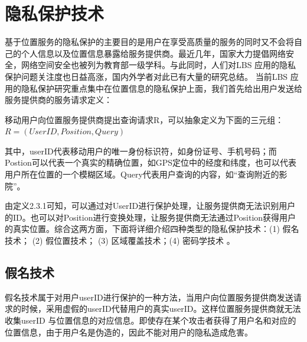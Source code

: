 \section{隐私保护技术}
基于位置服务的隐私保护的主要目的是用户在享受高质量的服务的同时又不会将自己的个人信息以及位置信息暴露给服务提供商。最近几年，国家大力提倡网络安全，网络空间安全也被列为教育部一级学科。与此同时，人们对LBS 应用的隐私保护问题关注度也日益高涨，国内外学者对此已有大量的研究总结\cite{group}\cite{Beresford}\cite{ChengR}。 当前LBS 应用的隐私保护研究重点集中在位置信息的隐私保护上面，我们首先给出用户发送给服务提供商的服务请求定义：
\begin{define}[：LBS服务请求]
移动用户向位置服务提供商提出查询请求R，可以抽象定义为下面的三元组：
$R=(UserID,Position,Query)$
\end{define}
其中，userID代表移动用户的唯一身份标识符，如身份证号、手机号码；而Postion可以代表一个真实的精确位置，如GPS定位中的经度和纬度，也可以代表用户所在位置的一个模糊区域。Query代表用户查询的内容，如“查询附近的影院”。

由定义2.3.1可知，可以通过对UserID进行保护处理，让服务提供商无法识别用户的ID。也可以对Position进行变换处理，让服务提供商无法通过Position获得用户的真实位置。综合这两方面，下面将详细介绍四种类型的隐私保护技术：(1) 假名技术； (2) 假位置技术； (3) 区域覆盖技术；(4) 密码学技术 。

\subsection{假名技术}
假名技术属于对用户userID进行保护的一种方法，当用户向位置服务提供商发送请求的时候，采用虚假的userID代替用户的真实userID。这样位置服务提供商就无法收集userID 与位置信息的对应信息。即使存在某个攻击者获得了用户名和对应的位置信息，由于用户名是伪造的，因此不能对用户的隐私造成危害。


